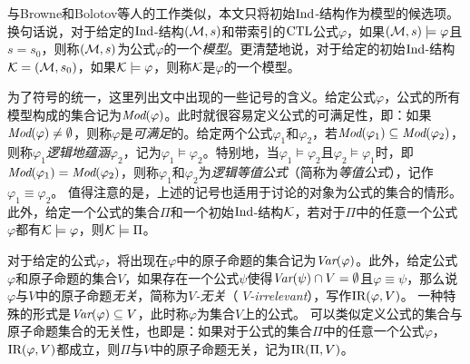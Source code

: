 与Browne和Bolotov等人的工作类似，本文只将初始$\textrm{Ind}$-结构作为模型的候选项\cite{browne1988characterizing,Bolotov:1999:JETAI}。换句话说，对于给定的$\textrm{Ind}$-结构$({\cal M},s)$和带索引的$\textrm{CTL}$公式$\varphi$，如果$({\cal M},s)\models \varphi$且$s = s_0$，则称$({\cal M},s)$为公式$\varphi$的一个\emph{模型}。更清楚地说，对于给定的初始$\textrm{Ind}$-结构${\cal K}=({\cal M},s_0)$，如果${\cal K} \models \varphi$，则称$\cal K$是$\varphi$的一个模型。

为了符号的统一，这里列出文中出现的一些记号的含义。给定公式$\varphi$，公式的所有模型构成的集合记为$\textit{Mod}(\varphi)$。此时就很容易定义公式的可满足性，即：如果$\textit{Mod}(\varphi)\not = \emptyset$，则称$\varphi$是\emph{可满足}的。给定两个公式$\varphi_1$和$\varphi_2$，若$\textit{Mod}(\varphi_1)\subseteq \textit{Mod}(\varphi_2)$，则称$\varphi_1$\emph{逻辑地蕴涵}$\varphi_2$，记为$\varphi_1\models \varphi_2$。特别地，当$\varphi_1\models \varphi_2$且$\varphi_2\models \varphi_1$时，即$\textit{Mod}(\varphi_1)= \textit{Mod}(\varphi_2)$，则称$\varphi_1$和$\varphi_2$为\emph{逻辑等值公式}（简称为\emph{等值公式}），记作$\varphi_1 \equiv \varphi_2$。
值得注意的是，上述的记号也适用于讨论的对象为公式的集合的情形。
此外，给定一个公式的集合$\Pi$和一个初始$\textrm{Ind}$-结构$\cal K$，若对于$\Pi$中的任意一个公式$\varphi$都有${\cal K} \models \varphi$，则${\cal K} \models \Pi$。

对于给定的公式$\varphi$，将出现在$\varphi$中的原子命题的集合记为$\textit{Var}(\varphi)$。此外，给定公式$\varphi$和原子命题的集合$V$，如果存在一个公式$\psi$使得$\textit{Var}(\psi) \cap V = \emptyset$且$\varphi \equiv \psi$，那么说$\varphi$与$V$中的原子命题\emph{无关}，简称为\emph{$V$-无关}（ \emph{$V$-irrelevant}），写作$\textrm{IR}(\varphi,V)$。
一种特殊的形式是$\textit{Var}(\varphi) \subseteq V$，此时称$\varphi$为集合$V$上的公式。
可以类似定义公式的集合与原子命题集合的无关性，也即是：如果对于公式的集合$\Pi$中的任意一个公式$\varphi$，$\textrm{IR}(\varphi,V)$都成立，则$\Pi$与$V$中的原子命题无关，记为$\textrm{IR}(\Pi,V)$。

